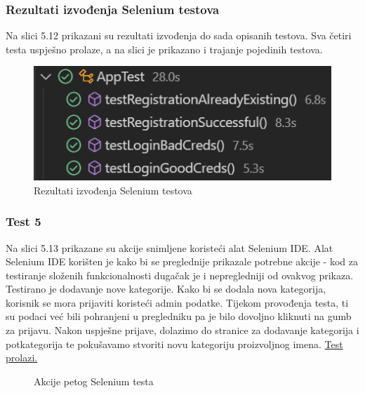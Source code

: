                 \subsubsection{Rezultati izvođenja Selenium testova}
                Na slici 5.12 prikazani su rezultati izvođenja do sada opisanih testova. Sva četiri testa uspješno prolaze, a na slici je prikazano i trajanje pojedinih testova.

                \begin{figure}[H]
				\includegraphics[]{slike/selenium_results.png}
				\centering
				\caption{Rezultati izvođenja Selenium testova}
				\label{fig:seleniumResults}
			\end{figure}

                \eject

                \subsubsection{Test 5}
                Na slici 5.13 prikazane su akcije snimljene koristeći alat Selenium IDE. Alat Selenium IDE korišten je kako bi se preglednije prikazale potrebne akcije - kod za testiranje složenih funkcionalnosti dugačak je i nepregledniji od ovakvog prikaza. Testirano je dodavanje nove kategorije. Kako bi se dodala nova kategorija, korisnik se mora prijaviti koristeći admin podatke. Tijekom provođenja testa, ti su podaci već bili pohranjeni u pregledniku pa je bilo dovoljno kliknuti na gumb za prijavu. Nakon uspješne prijave, dolazimo do stranice za dodavanje kategorija i potkategorija te pokušavamo stvoriti novu kategoriju proizvoljnog imena. \underline{Test prolazi.}

                \begin{figure}[H]
				\centering
				\caption{Akcije petog Selenium testa}
				\label{fig:selenium5}
			\end{figure}

